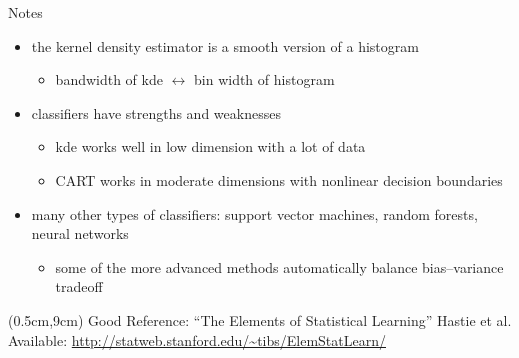 \documentclass[12pt]{beamer}
\newcommand{\foot}[1]{\begin{textblock*}{12cm}(0.5cm,9cm) %
  {\tiny #1}
      \end{textblock*}}
\begin{document}








\begin{frame}{Notes}
  \begin{itemize}
  \item the kernel density estimator is a smooth version of a histogram
    \begin{itemize}
    \item bandwidth of kde $\leftrightarrow$ bin width of histogram
    \end{itemize}
  \item classifiers have strengths and weaknesses
    \begin{itemize}
    \item kde works well in low dimension with a lot of data
    \item CART works in moderate dimensions with nonlinear decision boundaries
    \end{itemize}
  \item many other types of classifiers: support vector machines, random forests, neural networks
    \begin{itemize}
    \item some of the more advanced methods automatically balance bias--variance tradeoff
    \end{itemize}
  \end{itemize}

  \foot{Good Reference: ``The Elements of Statistical Learning'' Hastie et al. Available: \url{http://statweb.stanford.edu/~tibs/ElemStatLearn/}\\}
\end{frame}


\end{document}
